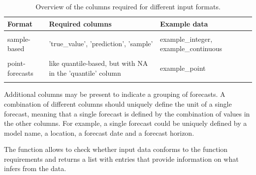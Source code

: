 \documentclass[
]{jss}
\begin{document}
\begin{CodeChunk}
\begin{table}

\caption{\label{tab:column-requirements}Overview of the columns required for different input formats.}
\centering
\begin{tabular}[t]{l>{\raggedright\arraybackslash}p{6cm}>{\raggedright\arraybackslash}p{3.7cm}}
\toprule
Format & Required columns & Example data\\
\midrule
\cellcolor{gray!6}{quantile-based} & \cellcolor{gray!6}{'true\_value', 'prediction', 'quantile'} & \cellcolor{gray!6}{example\_quantile}\\
\addlinespace
sample-based & 'true\_value', 'prediction', 'sample' & example\_integer,
  example\_continuous\\
\addlinespace
\cellcolor{gray!6}{binary} & \cellcolor{gray!6}{'true\_value', 'prediction'} & \cellcolor{gray!6}{example\_binary}\\
\addlinespace
point-forecasts & like quantile-based, but with
 NA in the 'quantile' column & example\_point\\
\addlinespace
\cellcolor{gray!6}{pairwise-comparisons} & \cellcolor{gray!6}{additionally a column 'model'} & \cellcolor{gray!6}{\textasciitilde{}}\\
\bottomrule
\end{tabular}
\end{table}

\end{CodeChunk}

Additional columns may be present to indicate a grouping of forecasts. A
combination of different columns should uniquely define the unit of a
single forecast, meaning that a single forecast is defined by the
combination of values in the other columns. For example, a single
forecast could be uniquely defined by a model name, a location, a
forecast date and a forecast horizon.

The function  allows to check whether input
data conforms to the function requirements and returns a list with
entries that provide information on what  infers from
the data.
\end{document}
